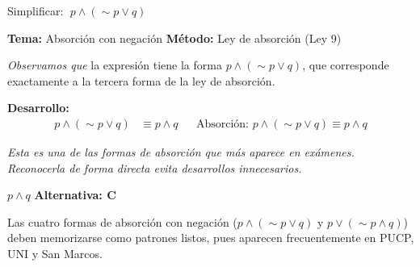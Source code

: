 \begin{tcolorbox}[
  enhanced, breakable,
  colback=GrisClaro, colframe=AzulPizarra,
  fonttitle=\bfseries\sffamily,
  title={Ejercicio 2 --- Nivel B\'{a}sico (Absorci\'{o}n)},
  arc=3pt, boxrule=0.8pt
]
\begin{problema}
  Simplificar: $\;p \wedge (\sim p \vee q)$
\end{problema}

\smallskip
\noindent
\textbf{\sffamily\color{AzulMedio}Tema:} Absorción con negación
\hfill
\textbf{\sffamily\color{AzulMedio}M\'{e}todo:} Ley de absorción (Ley 9)

\medskip
\noindent\textit{Observamos que} la expresión tiene la forma
$p \wedge (\sim p \vee q)$, que corresponde exactamente a la tercera
forma de la ley de absorción.

\medskip
\noindent\textbf{\sffamily Desarrollo:}
\begin{align*}
  p \wedge (\sim p \vee q)
  &\equiv p \wedge q
  && \text{Absorci\'{o}n: } p \wedge (\sim p \vee q) \equiv p \wedge q
\end{align*}

\noindent\textit{Esta es una de las formas de absorción que más aparece
en exámenes. Reconocerla de forma directa evita desarrollos innecesarios.}

\medskip
\begin{tcolorbox}[
  colback=AzulClaro!60, colframe=AzulPizarra,
  arc=2pt, boxrule=0.8pt, left=8pt, right=8pt
]
\centering
$\displaystyle \boxed{p \wedge q}$
\quad \textbf{Alternativa: C}
\end{tcolorbox}

\begin{cajatip}
  Las cuatro formas de absorción con negación ($p \wedge (\sim p \vee q)$
  y $p \vee (\sim p \wedge q)$) deben memorizarse como patrones listos,
  pues aparecen frecuentemente en PUCP, UNI y San Marcos.
\end{cajatip}
\end{tcolorbox}
\vspace{0.5cm}

